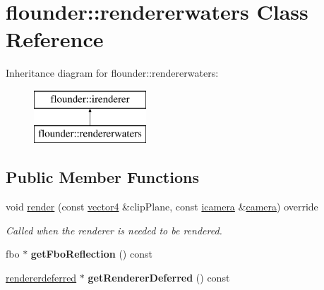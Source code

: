\hypertarget{classflounder_1_1rendererwaters}{}\section{flounder\+:\+:rendererwaters Class Reference}
\label{classflounder_1_1rendererwaters}
Inheritance diagram for flounder\+:\+:rendererwaters\+:\begin{figure}[H]
\begin{center}
\leavevmode
\includegraphics[height=2.000000cm]{classflounder_1_1rendererwaters}
\end{center}
\end{figure}
\subsection*{Public Member Functions}
\begin{DoxyCompactItemize}
\item 
void \hyperlink{classflounder_1_1rendererwaters_a2adb0c22d5aa6c76fb6eee3f69239398}{render} (const \hyperlink{classflounder_1_1vector4}{vector4} \&clip\+Plane, const \hyperlink{classflounder_1_1icamera}{icamera} \&\hyperlink{classflounder_1_1camera}{camera}) override
\begin{DoxyCompactList}\small\item\em Called when the renderer is needed to be rendered. \end{DoxyCompactList}\item 
\mbox{\label{classflounder_1_1rendererwaters_a7808dba1a99527d4a51a434270c7a448}} 
fbo $\ast$ {\bfseries get\+Fbo\+Reflection} () const
\item 
\mbox{\label{classflounder_1_1rendererwaters_a0dede38154a0a0f6dfd99ffef3e237fe}} 
\hyperlink{classflounder_1_1rendererdeferred}{rendererdeferred} $\ast$ {\bfseries get\+Renderer\+Deferred} () const
\end{DoxyCompactItemize}
